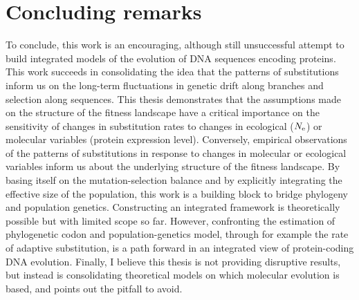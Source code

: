 \section{Concluding remarks}
\label{sec:concluding-remarks}

To conclude, this work is an encouraging, although still unsuccessful attempt to build integrated models of the evolution of \acrshort{DNA} sequences encoding proteins.
This work succeeds in consolidating the idea that the patterns of substitutions inform us on the long-term fluctuations in genetic drift along branches and selection along sequences.
This thesis demonstrates that the assumptions made on the structure of the fitness landscape have a critical importance on the sensitivity of changes in substitution rates to changes in ecological ($N_{\textrm{e}}$) or molecular variables (protein expression level).
Conversely, empirical observations of the patterns of substitutions in response to changes in molecular or ecological variables inform us about the underlying structure of the fitness landscape.
By basing itself on the mutation-selection balance and by explicitly integrating the effective size of the population, this work is a building block to bridge phylogeny and population genetics.
Constructing an integrated framework is theoretically possible but with limited scope so far.
However, confronting the estimation of phylogenetic codon and population-genetics model, through for example the rate of adaptive substitution, is a path forward in an integrated view of protein-coding \acrshort{DNA} evolution.
Finally, I believe this thesis is not providing disruptive results, but instead is consolidating theoretical models on which molecular evolution is based, and points out the pitfall to avoid.
